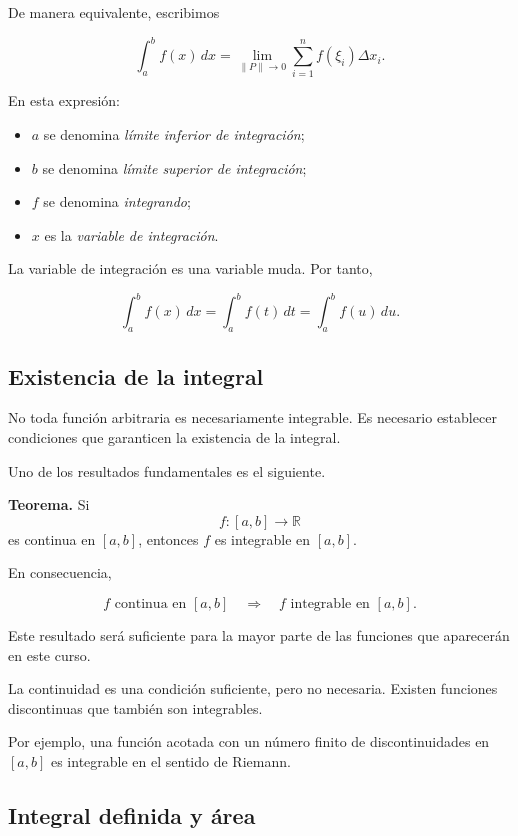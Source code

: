 \documentclass[12pt]{article}
\begin{document}
De manera equivalente, escribimos

\[
\boxed{
\int_a^b f(x)\,dx
=
\lim_{\|P\|\to0}
\sum_{i=1}^{n}f(\xi_i)\Delta x_i.
}
\]

En esta expresión:

\begin{itemize}
    \item $a$ se denomina \emph{límite inferior de integración};
    \item $b$ se denomina \emph{límite superior de integración};
    \item $f$ se denomina \emph{integrando};
    \item $x$ es la \emph{variable de integración}.
\end{itemize}

La variable de integración es una variable muda. Por tanto,

\[
\int_a^b f(x)\,dx
=
\int_a^b f(t)\,dt
=
\int_a^b f(u)\,du.
\]

\subsection{Existencia de la integral}

No toda función arbitraria es necesariamente integrable. Es necesario
establecer condiciones que garanticen la existencia de la integral.

Uno de los resultados fundamentales es el siguiente.

\textbf{Teorema.}
Si
\[
f:[a,b]\longrightarrow\mathbb{R}
\]
es continua en $[a,b]$, entonces $f$ es integrable en $[a,b]$.

En consecuencia,

\[
\boxed{
f\text{ continua en }[a,b]
\quad\Longrightarrow\quad
f\text{ integrable en }[a,b].
}
\]

Este resultado será suficiente para la mayor parte de las funciones que
aparecerán en este curso.

La continuidad es una condición suficiente, pero no necesaria. Existen
funciones discontinuas que también son integrables.

Por ejemplo, una función acotada con un número finito de discontinuidades
en $[a,b]$ es integrable en el sentido de Riemann.

\subsection{Integral definida y área}
\end{document}
